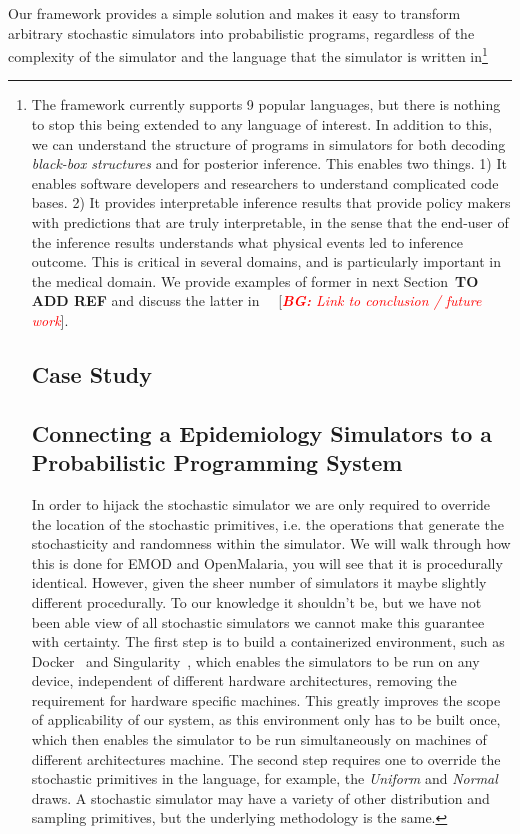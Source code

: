\documentclass{article}
\newcommand{\bg}[1]{~{{[{\it \textcolor{red}{{\bf BG:} #1}}]}}}
\begin{document}
Our framework provides a simple solution and makes it easy to transform arbitrary stochastic simulators into probabilistic programs, regardless of the complexity of the simulator and the language that the simulator is written in\footnote{The framework currently supports 9 popular languages, but there is nothing to stop this being extended to any language of interest. 
In addition to this, we can understand the structure of programs in simulators for both decoding \emph{black-box structures} and for posterior inference. 
This enables two things. 1) It enables software developers and researchers to understand complicated code bases. 
2) It provides interpretable inference results that provide policy makers with predictions that are truly interpretable, in the sense that the end-user of the inference results understands what physical events led to inference outcome. 
This is critical in several domains, and is particularly important in the medical domain. 
We provide examples of former in next Section~\textbf{TO ADD REF} and discuss the latter in ~\bg{Link to conclusion / future work}.


\section{Case Study}
\subsection{Connecting a Epidemiology Simulators to a Probabilistic Programming System}

In order to hijack the stochastic simulator we are only required to override the location of the stochastic primitives, i.e. the operations that generate the stochasticity and randomness within the simulator. 
We will walk through how this is done for EMOD and OpenMalaria, you will see that it is procedurally identical.
However, given the sheer number of simulators it maybe slightly different procedurally. 
To our knowledge it shouldn't be, but we have not been able view of all stochastic simulators we cannot make this guarantee with certainty. 
The first step is to build a containerized environment, such as Docker~\cite{merkel2014docker} and Singularity~\cite{kurtzer2017singularity}, which enables the simulators to be run on any device, independent of different hardware architectures, removing the requirement for hardware specific machines. 
This greatly improves the scope of applicability of our system, as this environment only has to be built once, which then enables the simulator to be run simultaneously on machines of different architectures machine. 
The second step requires one to override the stochastic primitives in the language, for example, the \emph{Uniform} and \emph{Normal} draws. 
A stochastic simulator may have a variety of other distribution and sampling primitives, but the underlying methodology is the same. 


}
\end{document}
